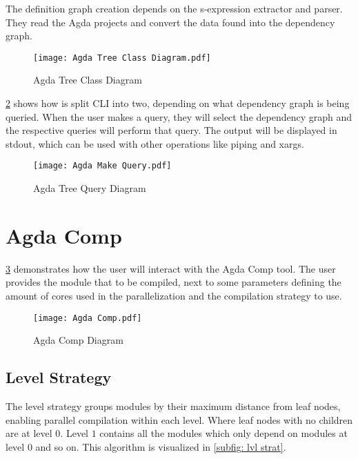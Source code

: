 The definition graph creation depends on the s-expression extractor and parser.
They read the Agda projects and convert the data found into the dependency
graph.

\begin{figure}[H]
    \centering
    \texttt{[image: Agda Tree Class Diagram.pdf]}
    \caption{Agda Tree Class Diagram}
    \label{fig:Agda Tree Class Diagram}
\end{figure} 
    
\pagebreak

\cref{fig:Agda Tree Query Diagram} shows how is split CLI into two, depending
on what dependency graph is being queried. When the user makes a query, they
will select the dependency graph and the respective queries will perform that
query. The output will be displayed in stdout, which can be used with other
operations like piping and xargs.

\begin{figure}[H]
    \centering
    \texttt{[image: Agda Make Query.pdf]}
    \caption{Agda Tree Query Diagram}
    \label{fig:Agda Tree Query Diagram}
\end{figure} 

\pagebreak 


\section{Agda Comp}

\cref{fig:Agda Comp Diagram} demonstrates how the user will interact with
the Agda Comp tool. The user provides the module that to be compiled, next to some
parameters defining the amount of cores used in the parallelization and the
compilation strategy to use.
\begin{figure}[H]
    \centering 
    \texttt{[image: Agda Comp.pdf]}
    \caption{Agda Comp Diagram}
    \label{fig:Agda Comp Diagram}
\end{figure} 

\pagebreak
\subsection{Level Strategy} \label{sub:design level strategy}

The level strategy groups modules by their maximum distance from leaf nodes,
enabling parallel compilation within each level. Where leaf nodes with no
children are at level \(0\). Level \(1\) contains all the modules which only
depend on modules at level \(0\) and so on. This algorithm is visualized in
\cref{subfig: lvl strat}.

